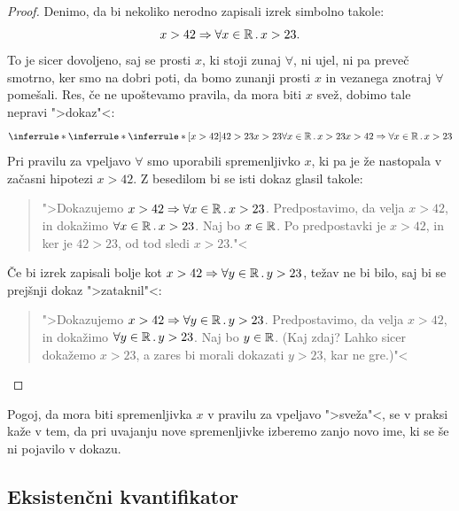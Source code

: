\begin{proof}
  Denimo, da bi nekoliko nerodno zapisali izrek simbolno takole:
  \begin{equation*}
    x > 42 \Rightarrow \forall x \in \mathbb{R} \,.\, x > 23.
  \end{equation*}
  To je sicer dovoljeno, saj se prosti $x$, ki stoji zunaj $\forall$,
  ni ujel, ni pa preveč smotrno, ker smo na dobri poti, da bomo
  zunanji prosti $x$ in vezanega znotraj $\forall$ pomešali. Res, če
  ne upoštevamo pravila, da mora biti $x$ svež, dobimo tale nepravi
  ">dokaz"<:
  \begin{equation*}
    \inferrule*
    {
      \inferrule*
      {\inferrule*
        {[x > 42] \\ 42 > 23}
        {x > 23}
      }
      {\all{x \in \RR} x > 23}
    }
    {x > 42 \lthen \all{x \in \RR} x > 23}
  \end{equation*}
  Pri pravilu za vpeljavo $\forall$ smo uporabili spremenljivko $x$,
  ki pa je že nastopala v začasni hipotezi $x > 42$. Z besedilom bi se
  isti dokaz glasil takole:
  \begin{quote}
    ">Dokazujemo $x > 42 \Rightarrow \forall x \in \mathbb{R} \,.\, x > 23$. Predpostavimo,
    da velja $x > 42$, in dokažimo $\forall x \in \mathbb{R} \,.\, x > 23$. Naj bo $x
    \in \mathbb{R}$. Po predpostavki je $x > 42$, in ker je $42 > 23$, od tod
    sledi $x > 23$."<
  \end{quote}
  Če bi izrek zapisali bolje kot $x > 42 \Rightarrow \forall y \in \mathbb{R} \,.\, y >
    23$, težav ne bi bilo, saj bi se prejšnji dokaz ">zataknil"<:
  \begin{quote}
    ">Dokazujemo $x > 42 \Rightarrow \forall y \in \mathbb{R} \,.\, y > 23$. Predpostavimo,
    da velja $x > 42$, in dokažimo $\forall y \in \mathbb{R} \,.\, y > 23$. Naj bo $y
    \in \mathbb{R}$. (Kaj zdaj? Lahko sicer dokažemo $x > 23$, a zares bi
    morali dokazati $y > 23$, kar ne gre.)"<
  \end{quote}
\end{proof}

Pogoj, da mora biti spremenljivka $x$ v pravilu za vpeljavo ">sveža"<,
se v praksi kaže v tem, da pri uvajanju nove spremenljivke izberemo
zanjo novo ime, ki se še ni pojavilo v dokazu.

\subsection{Eksistenčni kvantifikator}

\label{sec:eksistencni-kvantifikator}

